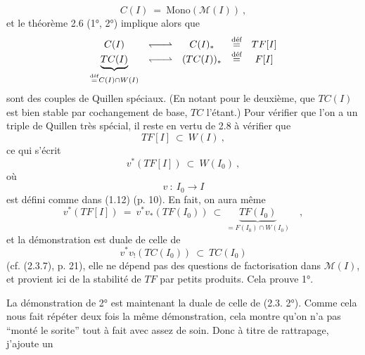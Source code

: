 \documentclass[11pt]{article}
\newcommand{\msp}[1]{\marginpar{\footnotesize [#1]}}
\newcommand{\deq}{\overset{\text{déf}}{=}}
\newcommand{\Mono}{\mathrm{Mono}}
\newcommand{\qpair}{\mathrel{\leftharpoondown\joinrel\relbar\joinrel\rightharpoonup}}
\begin{document}
\[ C(I) \ = \ \Mono(\mathcal{M}(I))\ , \]
et le théorème 2.6 (1°, 2°) implique alors que
\[ \begin{array}{ccccc}
C(I) & \qpair & C(I)_* & \deq & TF[I]\\
\underbrace{TC(I)}_{\deq C(I)\cap W(I)} & \qpair & (TC(I))_* & \deq & F[I]
\end{array} \] %
sont des couples de Quillen spéciaux. (En notant pour le deuxième, que $TC(I)$ est bien \msp{page 30} stable par cochangement de base, $TC$ l'étant.) Pour vérifier que l'on a un triple de Quillen très spécial, il reste en vertu de 2.8 à vérifier que
\[ TF[I] \ \subset\ W(I)\ , \]
ce qui s'écrit
\[ v^*(TF[I]) \ \subset\ W(I_0)\ , \]
où
\[ v \ :\ I_0 \longrightarrow I \]
est défini comme dans (1.12) (p. 10). En fait, on aura même
\[ v^*(TF[I]) \ = \ v^*v_*(TF(I_0)) \ \subset\ \underbrace{TF(I_0)}_{= F(I_0)\cap W(I_0)}\quad , \]
et la démonstration est duale de celle de
\[ v^*v_!(TC(I_0)) \ \subset\ TC(I_0) \]
(cf. (2.3.7), p. 21), elle ne dépend pas des questions de factorisation dans $\mathcal{M}(I)$, et provient ici de la stabilité de $TF$ par petits produits. Cela prouve 1°.

La démonstration de 2° est maintenant la duale de celle de (2.3. 2°). Comme cela nous fait répéter deux fois la même démonstration, cela montre qu'on n'a pas “monté le sorite” tout à fait avec assez de soin. Donc à titre de rattrapage, j'ajoute un
\end{document}
